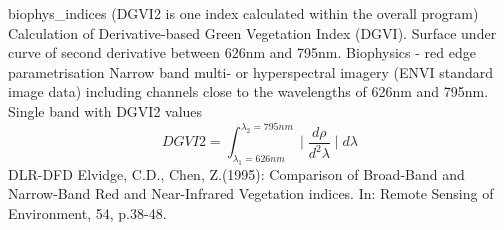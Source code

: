 %
{ %
biophys\_indices (DGVI2 is one index calculated within the overall program)
}
%
{ %
Calculation of Derivative-based Green Vegetation Index (DGVI). Surface under curve of second derivative between 626nm and 795nm.
}
%
{ %
Biophysics - red edge parametrisation
}
%
{ %
Narrow band multi- or hyperspectral imagery (ENVI standard image data) including channels close to the wavelengths of 626nm and 795nm.\bigskip
}
%
{ %
Single band with DGVI2 values
}
%
{ %
\begin{displaymath}
DGVI2 = \int _{\lambda_1 =626nm}^{\lambda_2 =795nm} \mid \frac{d \rho}{d^2  \lambda }\mid d \lambda
\end{displaymath}
}
%
{ %
DLR-DFD
}
%
{ %
Elvidge, C.D., Chen, Z.(1995): Comparison of Broad-Band and Narrow-Band Red and Near-Infrared Vegetation indices. In: Remote Sensing of Environment, 54, p.38-48.
}
